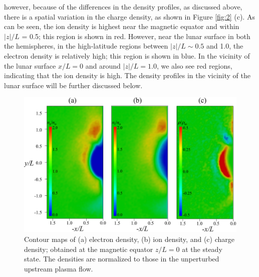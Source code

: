 \documentclass[draft,jgrga]{agutex2015}
\begin{document}
\begin{article}
however, because of the differences in the density profiles, as discussed above, 
there is a spatial variation in the charge density, as shown in Figure \ref{fig:2} (c). 
As can be seen, the ion density is highest near the magnetic equator and
within $|z|/L$ = 0.5; this region is shown in red. 
However, near the lunar surface in both the hemispheres, in the high-latitude regions between $|z|/L \sim 0.5$ and 1.0, 
the electron density is relatively high; this region is shown in blue.
In the vicinity of the lunar surface $x/L=0$ and around $|z|/L=1.0$, 
we also see red regions, indicating that the ion density is high.
The density profiles in the vicinity of the lunar surface will be further discussed below.


\begin{figure}[t]
\centering
\noindent\includegraphics[width=15cm]{./figures/Fig_3_bb-crop.pdf}
\caption{
Contour maps of (a) electron density, (b) ion density, and (c) charge density; 
obtained at the magnetic equator $z/L=0$ at the steady state.
The densities are normalized to those in the unperturbed upstream plasma flow.
}
\label{fig:3}
\end{figure}


\end{article}
\end{document}
